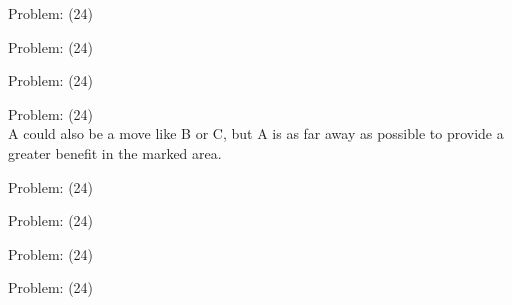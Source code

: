 \documentclass[11pt]{article}
\begin{document}
\begin{minipage}[t]{0.5\textwidth}
  {\centering
  
Problem: (24)\\
  }
\end{minipage}
\begin{minipage}[t]{0.5\textwidth}
  {\centering
  
Problem: (24)\\
  }
\end{minipage}
\begin{minipage}[t]{0.5\textwidth}
  {\centering
  
Problem: (24)\\
  }
\end{minipage}
\begin{minipage}[t]{0.5\textwidth}
  {\centering
  
Problem: (24)\\
A could also be a move like B or C, but A is as far away as possible to provide a greater benefit in the marked area.\\
  }
\end{minipage}
\begin{minipage}[t]{0.5\textwidth}
  {\centering
  
Problem: (24)\\
  }
\end{minipage}
\begin{minipage}[t]{0.5\textwidth}
  {\centering
  
Problem: (24)\\
  }
\end{minipage}
\begin{minipage}[t]{0.5\textwidth}
  {\centering
  
Problem: (24)\\
  }
\end{minipage}
\begin{minipage}[t]{0.5\textwidth}
  {\centering
  
Problem: (24)\\
  }
\end{minipage}
\end{document}
